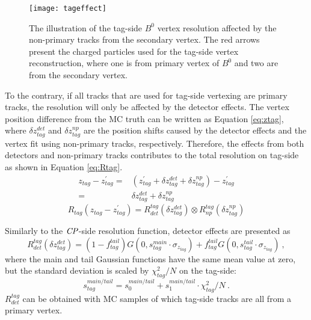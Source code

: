 \begin{figure}[htpb]
\centering
\texttt{[image: tageffect]}
\caption{The illustration of the tag-side $B^0$ vertex resolution affected by the non-primary tracks from the secondary vertex. The red arrows present the charged particles used for the tag-side vertex reconstruction, where one is from primary vertex of $B^0$ and two are from the secondary vertex.}
\label{fig:tagvet}
\end{figure}
To the contrary, if all tracks that are used for tag-side vertexing are primary tracks, the resolution will only be affected by the detector effects. The vertex position difference from the MC truth can be written as Equation \ref{eq:ztag}, where $\delta z_{tag}^{det}$ and $\delta z_{tag}^{np}$ are the position shifts caused by the detector effects and the vertex fit using non-primary tracks, respectively. Therefore, the effects from both detectors and non-primary tracks contributes to the total resolution on tag-side as shown in Equation \ref{eq:Rtag}.
\begin{equation}\label{eq:ztag}
\begin{split}
z_{tag} - z_{tag}^{'} =& (z_{tag}^{'} + \delta z_{tag}^{det} + \delta z_{tag}^{np}) - z_{tag}^{'}\\
=&\delta z_{tag}^{det} + \delta z_{tag}^{np}
\end{split}
\end{equation}
\begin{equation}\label{eq:Rtag}
R_{tag}( z_{tag}- z_{tag}^{'}) = R_{det}^{tag}(\delta z_{tag}^{det}) \otimes
R_{np}^{tag}( \delta z_{tag}^{np})
\end{equation}

Similarly to the $\it{CP}$-side resolution function, detector effects are presented as
\begin{equation}\label{eq:Rtagdet}
R_{det}^{tag}(\delta z_{tag}^{det}) = (1-f_{tag}^{tail})G(0,s_{tag}^{main}\cdot\sigma_{z_{tag}})+
f_{tag}^{tail}G(0,s_{tag}^{tail}\cdot\sigma_{z_{tag}})~,
\end{equation} where the main and tail Gaussian functions have the same mean value at zero, but the standard deviation is scaled by $\chi^2_{tag}/N$ on the tag-side:
\begin{equation}\label{eq:stag}
s_{tag}^{main/tail} = s_0^{main/tail} + s_1^{main/tail}\cdot\chi^2_{tag}/N~.
\end{equation} 
$R^{tag}_{det}$ can be obtained with MC samples of which tag-side tracks are all from a primary vertex. 

